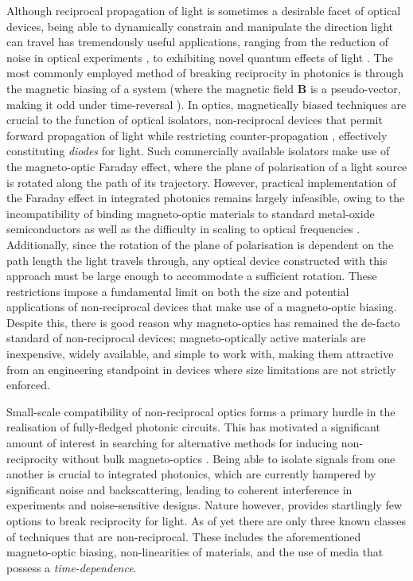 Although reciprocal propagation of light is sometimes a desirable facet of optical devices, being able to dynamically constrain and manipulate the direction light can travel has tremendously useful applications, ranging from the reduction of noise in optical experiments \cite{Khanikaev2014a}, to exhibiting novel quantum effects of light \cite{Yilmaz2015a}. The most commonly employed method of breaking reciprocity in photonics is through the magnetic biasing of a system (where the magnetic field $\bm{B}$ is a pseudo-vector, making it odd under time-reversal \cite{Wang2006a}). In optics, magnetically biased techniques are crucial to the function of optical isolators, non-reciprocal devices that permit forward propagation of light while restricting counter-propagation \cite{Jalas2013a}, effectively constituting \textit{diodes} for light. Such commercially available isolators make use of the magneto-optic Faraday effect, where the plane of polarisation of a light source is rotated along the path of its trajectory. However, practical implementation of the Faraday effect in integrated photonics remains largely infeasible, owing to the incompatibility of binding magneto-optic materials to standard metal-oxide semiconductors \cite{Feng2011a} as well as the difficulty in scaling to optical frequencies \cite{Monticone2017}. Additionally, since the rotation of the plane of polarisation is dependent on the path length the light travels through, any optical device constructed with this approach must be large enough to accommodate a sufficient rotation. These restrictions impose a fundamental limit on both the size and potential applications of non-reciprocal devices that make use of a magneto-optic biasing. Despite this, there is good reason why magneto-optics has remained the de-facto standard of non-reciprocal devices; magneto-optically active materials are inexpensive, widely available, and simple to work with, making them attractive from an engineering standpoint in devices where size limitations are not strictly enforced.

Small-scale compatibility of non-reciprocal optics forms a primary hurdle in the realisation of fully-fledged photonic circuits. This has motivated a significant amount of interest in searching for alternative methods for inducing non-reciprocity without bulk magneto-optics \cite{Fang2012a, Rabla, Shoji2014,Li2014a}. Being able to isolate signals from one another is crucial to integrated photonics, which are currently hampered by significant noise and backscattering, leading to coherent interference in experiments and noise-sensitive designs. Nature however, provides startlingly few options to break reciprocity for light. As of yet there are only three known classes of techniques that are non-reciprocal. These includes the aforementioned magneto-optic biasing, non-linearities of materials, and the use of media that possess a \textit{time-dependence}.

